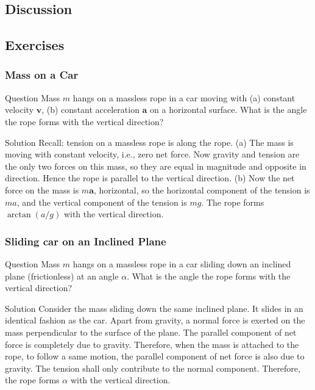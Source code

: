 \subsection{Discussion}
\subsection{Exercises}
\begin{frame}
\frametitle{Mass on a Car}
\begin{block}{Question}
Mass $m$ hangs on a massless rope in a car moving with (a) constant velocity $\mathbf{v}$, (b) constant acceleration $\mathbf{a}$ on a horizontal surface. What is the angle the rope forms with the vertical direction?
\end{block}
\begin{block}{Solution}
Recall: \alert{tension} on a massless rope is along the rope. (a) The mass is moving with constant velocity, i.e., \alert{zero net force}. Now gravity and tension are the only \alert{two forces} on this mass, so they are equal in magnitude and opposite in direction. Hence the rope is parallel to the vertical direction. (b) Now the net force on the mass is $m\mathbf{a}$, horizontal, so the \alert{horizontal component} of the \alert{tension} is $ma$, and the \alert{vertical component} of the \alert{tension} is $mg$. The rope forms $\arctan(a/g)$ with the vertical direction.
\end{block}
\end{frame}
\begin{frame}
\frametitle{Sliding car on an Inclined Plane}
\begin{block}{Question}
Mass $m$ hangs on a massless rope in a car sliding down an inclined plane (frictionless) at an angle $\alpha$. What is the angle the rope forms with the vertical direction?
\end{block}
\begin{block}{Solution}
Consider the mass sliding down the same inclined plane. It slides in an identical fashion as the car. Apart from gravity, a normal force is exerted on the mass \alert{perpendicular} to the surface of the plane. The \alert{parallel component} of net force is completely due to gravity. Therefore, when the mass is attached to the rope, to follow a same motion, the \alert{parallel component} of net force is also due to gravity. The \alert{tension} shall only contribute to the \alert{normal component}. Therefore, the rope forms $\alpha$ with the vertical direction.
\end{block}
\end{frame}
